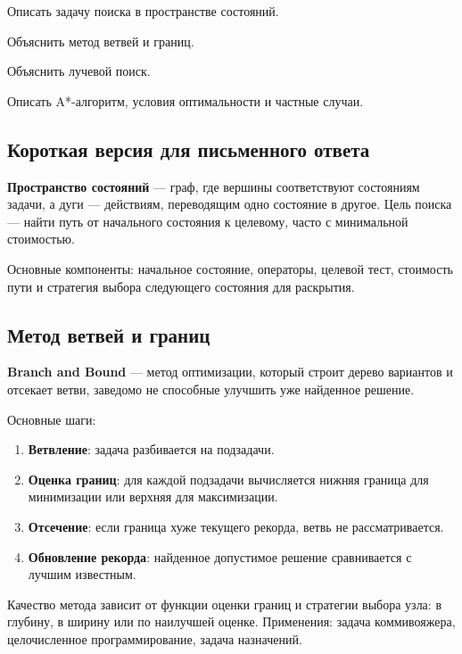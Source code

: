 
\begin{examplan}
    \item Описать задачу поиска в пространстве состояний.
    \item Объяснить метод ветвей и границ.
    \item Объяснить лучевой поиск.
    \item Описать A*-алгоритм, условия оптимальности и частные случаи.
\end{examplan}

\subsection*{Короткая версия для письменного ответа}

\textbf{Пространство состояний} --- граф, где вершины соответствуют состояниям задачи, а дуги --- действиям, переводящим одно состояние в другое. Цель поиска --- найти путь от начального состояния к целевому, часто с минимальной стоимостью.

Основные компоненты: начальное состояние, операторы, целевой тест, стоимость пути и стратегия выбора следующего состояния для раскрытия.

\subsection*{Метод ветвей и границ}

\textbf{Branch and Bound} --- метод оптимизации, который строит дерево вариантов и отсекает ветви, заведомо не способные улучшить уже найденное решение.

Основные шаги:
\begin{enumerate}
    \item \textbf{Ветвление}: задача разбивается на подзадачи.
    \item \textbf{Оценка границ}: для каждой подзадачи вычисляется нижняя граница для минимизации или верхняя для максимизации.
    \item \textbf{Отсечение}: если граница хуже текущего рекорда, ветвь не рассматривается.
    \item \textbf{Обновление рекорда}: найденное допустимое решение сравнивается с лучшим известным.
\end{enumerate}

Качество метода зависит от функции оценки границ и стратегии выбора узла: в глубину, в ширину или по наилучшей оценке. Применения: задача коммивояжера, целочисленное программирование, задача назначений.

